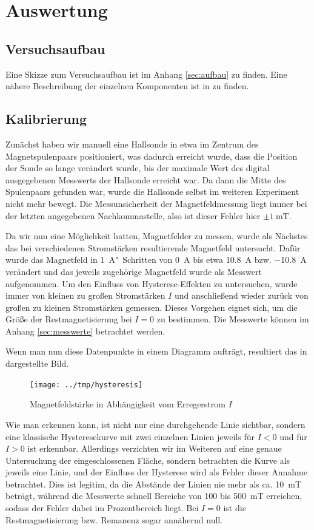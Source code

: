 \section{Auswertung}
\subsection{Versuchsaufbau}
Eine Skizze zum Versuchsaufbau ist im Anhang \ref{sec:aufbau} zu finden. Eine
nähere Beschreibung der einzelnen Komponenten ist in \cite{script} zu finden.

\subsection{Kalibrierung}
Zunächst haben wir manuell eine Hallsonde in etwa im Zentrum des
Magnetspulenpaars positioniert, was dadurch erreicht wurde, dass die Position
der Sonde so lange verändert wurde, bis der maximale Wert des digital
ausgegebenen Messwerts der Hallsonde erreicht war. Da dann die Mitte des
Spulenpaars gefunden war, wurde die Hallsonde selbst im weiteren Experiment
nicht mehr bewegt. Die Messunsicherheit der Magnetfeldmessung liegt immer bei
der letzten angegebenen Nachkommastelle, also ist dieser Fehler hier $\pm
\SI{1}{\milli\tesla}$.

Da wir nun eine Möglichkeit hatten, Magnetfelder zu messen, wurde als Nächstes
das bei verschiedenen Stromstärken resultierende Magnetfeld untersucht. Dafür
wurde das Magnetfeld in \SI{1}{\ampere}"~Schritten von \SI{0}{\ampere} bis etwa
\SI{10,8}{\ampere} bzw.
\SI{-10,8}{\ampere} verändert und das jeweils
zugehörige Magnetfeld wurde als Messwert aufgenommen. Um den Einfluss von
Hysterese-Effekten zu untersuchen, wurde immer von kleinen zu großen
Stromstärken $I$ und anschließend wieder zurück von großen zu kleinen
Stromstärken gemessen. Dieses Vorgehen eignet sich, um die Größe der
Restmagnetisierung bei $I=0$ zu bestimmen. Die Messwerte können im Anhang
\ref{sec:messwerte} betrachtet werden. 

Wenn man nun diese Datenpunkte in einem Diagramm aufträgt, resultiert das in
 dargestellte Bild.

\begin{figure}[htb]
   \centering
   \texttt{[image: ../tmp/hysteresis]}
   \caption{Magnetfeldstärke in Abhängigkeit vom Erregerstrom $I$}
   \label{fig:hysterese}
\end{figure}

Wie man erkennen kann, ist nicht nur eine durchgehende Linie sichtbar, sondern
eine klassische Hysteresekurve mit zwei einzelnen Linien jeweils für $I<0$ und
für $I>0$ ist erkennbar. Allerdings verzichten wir im Weiteren auf eine genaue
Untersuchung der eingeschlossenen Fläche, sondern betrachten die Kurve als
jeweils eine Linie, und der Einfluss der Hysterese wird als Fehler dieser
Annahme betrachtet. Dies ist legitim, da die Abstände der Linien nie mehr als
ca. \SI{10}{\milli\tesla} beträgt, während die Messwerte schnell Bereiche von
100 bis \SI{500}{\milli\tesla} erreichen, sodass der Fehler dabei im
Prozentbereich liegt. Bei $I=0$ ist die Restmagnetisierung bzw. Remanenz sogar
annähernd null.

